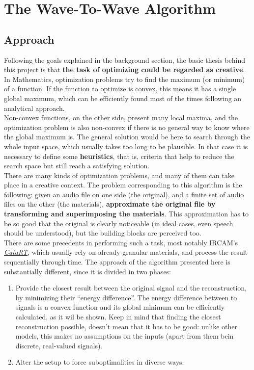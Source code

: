 \documentclass[11pt]{scrartcl} %
\begin{document}
\vspace{5mm}
\section*{The Wave-To-Wave Algorithm}

\subsection*{Approach}
Following the goals explained in the background section, the basic thesis behind this project is that \textbf{the task of optimizing could be regarded as creative}. In Mathematics, optimization problems try to find the maximum (or minimum) of a function. If the function to optimize is convex, this means it has a single global maximum, which can be efficiently found most of the times following an analytical approach.\\
Non-convex functions, on the other side, present many local maxima, and the optimization problem is also non-convex if there is no general way to know where the global maximum is. The general solution would be here to search through the whole input space, which usually takes too long to be plausible. In that case it is necessary to define some \textbf{heuristics}, that is, criteria that help to reduce the search space but still reach a satisfying solution.\\[7pt]
There are many kinds of optimization problems, and many of them can take place in a creative context. The problem corresponding to this algorithm is the following: given an audio file on one side (the original), and a finite set of audio files on the other (the materials), \textbf{approximate the original file by transforming and superimposing the materials}. This approximation has to be so good that the original is clearly noticeable (in ideal cases, even speech should be understood), but the building blocks are perceived too.\\[7pt]
There are some precedents in performing such a task, most notably IRCAM's \href{http://imtr.ircam.fr/imtr/CataRT}{{\it CataRT}}, which usually rely on already granular materials, and process the result sequentially through time. The approach of the algorithm presented here is substantially different, since it is divided in two phases:
\begin{enumerate}
\item Provide the closest result between the original signal and the reconstruction, by minimizing their ``energy difference''. The energy difference between to signals is a convex function and its global minimum can be efficiently calculated, as it wil be shown. Keep in mind that finding the closest reconstruction possible, doesn't mean that it has to be good: unlike other models, this makes no assumptions on the inputs (apart from them bein discrete, real-valued signals).
\item Alter the setup to force suboptimalities in diverse ways.
\end{enumerate}
\end{document}

